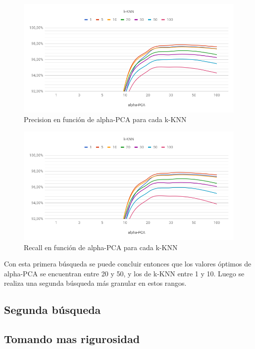 \begin{figure}
    \centering
    \includegraphics[width=\textwidth]{graficos/cv1_precision_zoom.png}
    \caption{Precision en función de alpha-PCA para cada k-KNN}
    \label{fig:cv1_precision_zoom}
\end{figure}

\begin{figure}
    \centering
    \includegraphics[width=\textwidth]{graficos/cv1_recall_zoom.png}
    \caption{Recall en función de alpha-PCA para cada k-KNN}
    \label{fig:cv1_recall_zoom}
\end{figure}

Con esta primera búsqueda se puede concluir entonces que los valores óptimos de alpha-PCA se encuentran entre 20 y 50, y los de k-KNN entre 1 y 10. Luego se realiza una segunda búsqueda más granular en estos rangos.

\subsection{Segunda búsqueda}

\subsection{Tomando mas rigurosidad}

